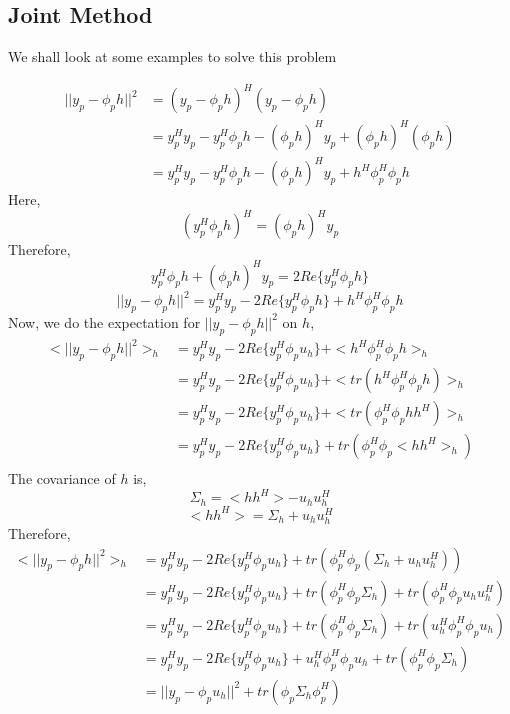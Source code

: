 \documentclass{article}
\begin{document}
\subsection{Joint Method}
We shall look at some examples to solve this problem

\begin{align}
||y_p-\phi_ph||^2 &= (y_p -\phi_ph)^H(y_p -\phi_ph) \\
&= y_p^Hy_p - y_p^H\phi_ph - (\phi_ph)^Hy_p  + (\phi_ph)^H(\phi_ph) \\
&= y_p^Hy_p - y_p^H\phi_ph - (\phi_ph)^Hy_p  + h^H\phi_p^H\phi_p h
\label{eq:jcesd-sbl-ce-alpha-0}
\end{align}
Here, 
\[
(y_p^H\phi_ph)^H = (\phi_ph)^Hy_p
\]
Therefore,
\[
y_p^H\phi_ph + (\phi_ph)^Hy_p = 2Re\{y_p^H \phi_p h\} 
\]
\[
||y_p-\phi_ph||^2 = y_p^Hy_p - 2Re\{y_p^H \phi_p h\}  + h^H\phi_p^H\phi_p h
\]
Now, we do the expectation for $||y_p-\phi_ph||^2$ on $h$,
\begin{align}
<||y_p-\phi_ph||^2>_h &= y_p^Hy_p - 2Re\{y_p^H \phi_p u_h\}  + <h^H\phi_p^H\phi_p h>_h\\
&= y_p^Hy_p - 2Re\{y_p^H \phi_p u_h\}  + <tr(h^H\phi_p^H\phi_p h)>_h \\
&= y_p^Hy_p - 2Re\{y_p^H \phi_p u_h\}  + <tr(\phi_p^H\phi_p hh^H)>_h \\
&= y_p^Hy_p - 2Re\{y_p^H \phi_p u_h\}  + tr(\phi_p^H\phi_p <hh^H>_h) \\
\end{align}
The covariance of $h$ is, 
\[
\Sigma_h = <hh^H> - u_h u_h^H
\]
\[
<hh^H> = \Sigma_h + u_h u_h^H
\]
Therefore,
\begin{align}
<||y_p-\phi_ph||^2>_h &= y_p^Hy_p - 2Re\{y_p^H \phi_p u_h\}  + tr(\phi_p^H\phi_p (\Sigma_h + u_h u_h^H)) \\
&= y_p^Hy_p - 2Re\{y_p^H \phi_p u_h\}  + tr(\phi_p^H\phi_p \Sigma_h) + tr(\phi_p^H\phi_p u_h u_h^H) \\
&= y_p^Hy_p - 2Re\{y_p^H \phi_p u_h\}  + tr(\phi_p^H\phi_p \Sigma_h) + tr(u_h^H\phi_p^H\phi_p u_h) \\
&= y_p^Hy_p - 2Re\{y_p^H \phi_p u_h\}  + u_h^H\phi_p^H\phi_p u_h + tr(\phi_p^H\phi_p \Sigma_h) \\
&= ||y_p - \phi_p u_h||^2 + tr(\phi_p \Sigma_h\phi_p^H)
\end{align}

\newpage


\end{document}
